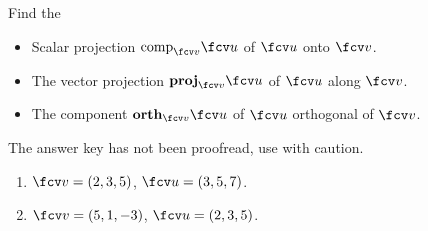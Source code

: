Find the
\begin{itemize}
\item Scalar projection $\text{comp}_{\fcv v} \fcv u$ of $\fcv u$ onto $\fcv v$.
\item The vector projection ${\bf proj}_{\fcv v}\fcv u$ of $\fcv u$ along $\fcv v$.
\item The component ${\bf orth}_{\fcv v}\fcv u$ of $\fcv u$ orthogonal of $\fcv v$.
\end{itemize}
The answer key has not been proofread, use with caution.
\begin{enumerate}
\item $\fcv v=( 2,3,5 )$, $\fcv u=( 3,5,7 )$.
\item $\fcv v=(  5,1,-3 )$, $\fcv u=(2,3,5 )$.
\end{enumerate}
